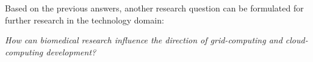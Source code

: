 \begin{itemize}



\end{itemize}


Based on the previous answers, another research question can be formulated for further research in the technology domain: 

\emph{How can biomedical research influence the direction of grid-computing and cloud-computing development?}

